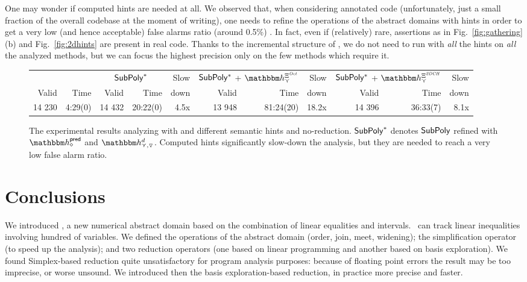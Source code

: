 \documentclass[sttt]{svjour}
\begin{document}
One may wonder if computed hints are needed at all.
We observed that, when considering annotated code (unfortunately, just a small fraction of the overall codebase at the moment of writing), one needs to refine the operations of the abstract domains with hints in order to get a very low (and hence acceptable) false alarms ratio (around 0.5\%) . 
In fact, even if (relatively) rare, assertions as in Fig.~\ref{fig:gathering}(b) and Fig.~\ref{fig:2dhints} are present in real code.
Thanks to the incremental structure of \Clousot, we do not need to run \Subpoly{} with \emph{all} the hints on \emph{all} the analyzed methods, but we can focus the highest precision only on the few methods which require it.


\begin{figure*}
\centering
\small
\begin{tabular}{@{}r r | r r r| r r r | r r r@{}}
                        \multicolumn{2}{c|}{\Subpoly{}} & 
                        \multicolumn{2}{c}{$\mathsf{SubPoly}^*$}
                          & Slow &
                       \multicolumn{2}{c}{$\mathsf{SubPoly}{}^*$ + $ \hint{\cjoin}^{\hintcomp^\mathit{Oct}}$}
                          & Slow 
&  \multicolumn{2}{c}{$\mathsf{SubPoly}{}^*$ + $ \hint{\cjoin}^{\hintcomp^\mathit{2DCH}}$} & Slow
                           \\
Valid & Time & Valid & Time & down & Valid & Time & down  & Valid & Time & down  \\

\hline
 14 230 &  4:29(0) & 14 432 & 20:22(0)     &  4.5x & 13 948 & 81:24(20) & 18.2x & 14 396 & 36:33(7) & 8.1x
\end{tabular}
\caption{The experimental results analyzing   with \Subpoly{} and different semantic hints and no-reduction.
$\mathsf{SubPoly}^*$ denotes $\mathsf{SubPoly}$  refined with $\hint{\diamond}^{\mathsf{pred}}$   and  $\hint{\cjoin,\widening}^{d}$.
Computed hints significantly slow-down the analysis, but they are needed to reach a very low false alarm ratio.}
\label{tab:subpoly}
\end{figure*}


\section{Conclusions}
We introduced \Subpoly, a new numerical abstract domain based on the combination of linear equalities and intervals.
\Subpoly\ can track linear inequalities involving hundred of variables.
We defined the operations of the abstract domain (order, join, meet, widening); the simplification operator (to speed up the analysis); and two reduction operators (one based on linear programming and another based on basis exploration).
We found Simplex-based reduction quite unsatisfactory for program analysis purposes: because of floating point errors the result may be too imprecise, or worse unsound.
We introduced then  the basis exploration-based reduction, in practice more precise and faster.
\end{document}
